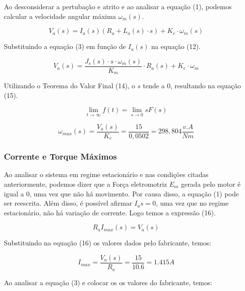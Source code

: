 \documentclass[12pt]{article}
\begin{document}
\quad Ao desconsiderar a pertubação e atrito e ao analisar a equação (1), podemos calcular a velocidade angular máxima $\omega_m(s)$.

\begin{equation}
    V_a(s) = I_a(s)(R_a + L_a(s)\cdot s) + K_e \cdot \omega_m(s)
\end{equation}

\quad Substituindo a equação (3) em função de $I_a(s)$ na equação (12).

\begin{equation}
V_a (s) = \frac{J_s(s) \cdot s \cdot \omega_m(s)}{K_m}\cdot R_a(s) + K_e \cdot \omega_m    
\end{equation}

\quad Utilizando o Teorema do Valor Final (14), o $s$ tende a 0, resultando na equação (15).

\begin{equation}
    \lim_{t \to \infty} f(t) = \lim_{s \to 0} sF(s)
\end{equation}

\begin{equation}
    \omega_{max} (s) = \frac{V_a(s)}{K_e} = \frac{15}{0,0502} = 298,804 \frac{v.A}{Nm}
\end{equation}

\subsubsection{Corrente e Torque Máximos}

\quad Ao analisar o sistema em regime estacionário e nas condições citadas anteriormente, podemos dizer que a Força eletromotriz $E_m$ gerada pelo motor é igual a 0, uma vez que não há movimento. Por causa disso, a equação (1) pode ser reescrita. Além disso, é possível afirmar $I_as = 0$, uma vez que no regime estacionário, não há variação de corrente. Logo temos a expressão (16). 

\begin{equation}
    R_a I_{max}(s) = V_a(s)
\end{equation}

\quad Substituindo na equação (16) os valores dados pelo fabricante, temos:

\begin{equation}
    I_{max} = \frac{V_a(s)}{R_a} = \frac{15}{10.6} = 1.415 A
\end{equation}

\quad Ao analisar a equação (3) e colocar os os valores do fabricante, temos:
\end{document}
